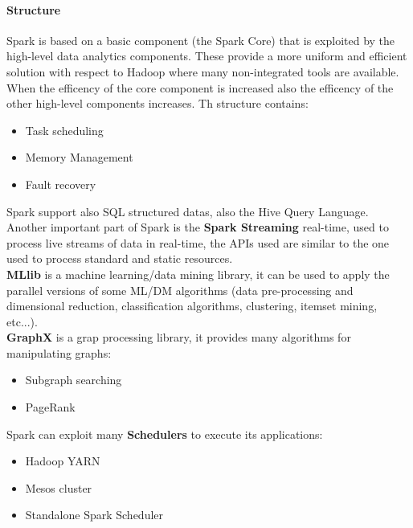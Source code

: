 \documentclass[12pt]{article}
\begin{document}
\paragraph{Structure} Spark is based on a basic component (the Spark Core) that is exploited by the high-level data analytics components. These provide a more uniform and efficient solution with respect to Hadoop where many non-integrated tools are available. When the efficency of the core component is increased also the efficency of the other high-level components increases.
Th structure contains:
\begin{itemize}
  \item Task scheduling
  \item Memory Management
  \item Fault recovery
\end{itemize}
Spark support also SQL structured datas, also the Hive Query Language.\\
Another important part of Spark is the \textbf{Spark Streaming} real-time, used to process live streams of data in real-time, the APIs used are similar to the one used to process standard and static resources.\\
\textbf{MLlib} is a machine learning/data mining library, it can be used to apply the parallel versions of some ML/DM algorithms (data pre-processing and dimensional reduction, classification algorithms, clustering, itemset mining, etc...).\\
\textbf{GraphX} is a grap processing library, it provides many algorithms for manipulating graphs:
\begin{itemize}
  \item Subgraph searching
  \item PageRank
\end{itemize}
Spark can exploit many \textbf{Schedulers} to execute its applications:
\begin{itemize}
  \item Hadoop YARN
  \item Mesos cluster
  \item Standalone Spark Scheduler
\end{itemize}
\end{document}
